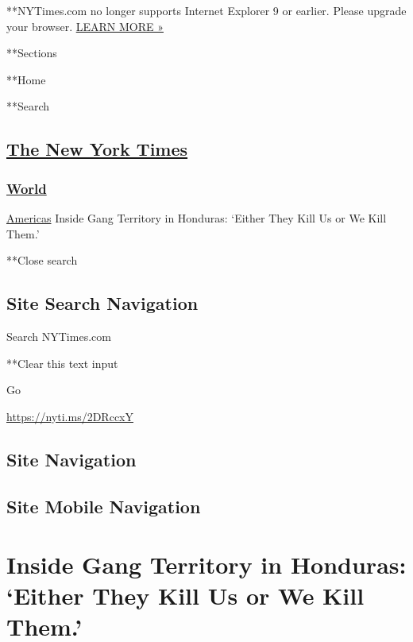  **NYTimes.com no longer supports Internet Explorer 9 or earlier. Please
upgrade your browser.
\href{http://www.nytimes.com/content/help/site/ie9-support.html}{LEARN
MORE »}

**Sections

**Home

**Search

\hypertarget{the-new-york-times}{%
\subsection{\texorpdfstring{\href{http://www.nytimes.com/}{The New York
Times}}{The New York Times}}\label{the-new-york-times}}

\hypertarget{-world-}{%
\subsubsection{\texorpdfstring{ \href{/section/world}{World}
}{ World }}\label{-world-}}

 \href{/section/world/americas}{Americas} \textbar{}Inside Gang
Territory in Honduras: `Either They Kill Us or We Kill Them.'

**Close search

\hypertarget{site-search-navigation}{%
\subsection{Site Search Navigation}\label{site-search-navigation}}

Search NYTimes.com

**Clear this text input

Go

\url{https://nyti.ms/2DRccxY}

\hypertarget{site-navigation}{%
\subsection{Site Navigation}\label{site-navigation}}

\hypertarget{site-mobile-navigation}{%
\subsection{Site Mobile Navigation}\label{site-mobile-navigation}}

\hypertarget{inside-gang-territory-in-honduras-either-they-kill-us-or-we-kill-them}{%
\section{Inside Gang Territory in Honduras: `Either They Kill Us or We
Kill
Them.'}\label{inside-gang-territory-in-honduras-either-they-kill-us-or-we-kill-them}}


